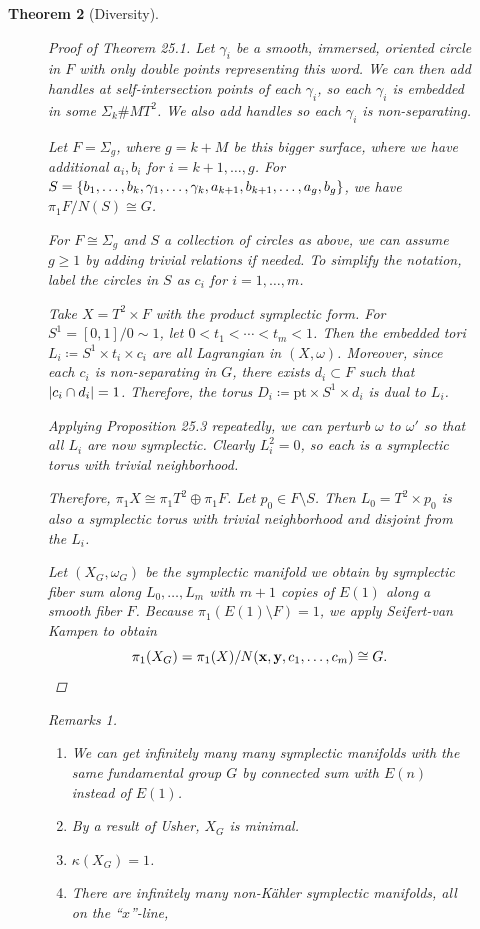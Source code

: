 \documentclass[leqno, openany]{memoir}
\newtheorem{thm}{Theorem}[chapter]
\theoremstyle{definition}
\theoremstyle{remark}
\newtheorem{rmks}[thm]{Remarks}
\theoremstyle{plain}
\theoremstyle{definition}
\theoremstyle{remark}
\newcommand{\mr}[1]{\mathrm{#1}}
\begin{document}
\begin{thm}[Diversity]
\begin{figure}[H]
\begin{proof}[Proof of Theorem 25.1]
        Let $\gamma_i$ be a smooth, immersed, oriented circle in $F$ with only
        double points representing this word. We can then add handles at
        self-intersection points of each $\gamma_i$, so each $\gamma_i$ is
        embedded in some $\Sigma_k \# M T^2$. We also add handles so each
        $\gamma_i$ is \textit{non-separating}.

        Let $F = \Sigma_g$, where $g = k + M$ be this bigger surface, where we
        have additional $a_i,b_i$ for $i = k+1, \ldots, g$. For $S = \qty{b_1,
        \ldots, b_k, \gamma_1, \ldots, \gamma_k, a_{k+1}, b_{k+1}, \ldots, a_g,
    b_g}$, we have $\pi_1 F / N(S) \cong G$. 

        For $F \cong \Sigma_g$ and $S$ a collection of circles as above, we can
        assume $g \geq 1$ by adding trivial relations if needed. To simplify
        the notation, label the circles in $S$ as $c_i$ for $i = 1, \ldots, m$.

        Take $X = T^2 \times F$ with the product symplectic form. For $S^1 =
        [0,1]/0 \sim 1$, let $0 < t_1 < \cdots < t_m < 1$. Then the embedded
        tori $L_i \coloneqq S^1 \times t_i \times c_i$ are all Lagrangian in
        $(X, \omega)$. Moreover, since each $c_i$ is non-separating in $G$,
        there exists $d_i \subset F$ such that $\abs{c_i \cap d_i} = 1$.
        Therefore, the torus $D_i \coloneqq \mr{pt} \times S^1 \times d_i$ is
        dual to $L_i$.

        Applying Proposition 25.3 repeatedly, we can perturb $\omega$ to
        $\omega'$ so that all $L_i$ are now symplectic. Clearly $L_i^2 = 0$, so
        each is a symplectic torus with trivial neighborhood.

        Therefore, $\pi_1 X \cong \pi_1 T^2 \oplus \pi_1 F$. Let $p_0 \in F
        \setminus S$. Then $L_0 = T^2 \times p_0$ is also a symplectic torus
        with trivial neighborhood and disjoint from the $L_i$.

        Let $(X_G, \omega_G)$ be the symplectic manifold we obtain by
        symplectic fiber sum along $L_0, \ldots, L_m$ with $m+1$ copies of
        $E(1)$ along a smooth fiber $F$. Because $\pi_1(E(1) \setminus F) = 1$,
        we apply Seifert-van Kampen to obtain \[ \pi_1(X_G) = \pi_1(X) /
        N(\mathbf{x}, \mathbf{y}, c_1, \ldots, c_m) \cong G. \qedhere \]
    \end{proof}

    \begin{rmks} \begin{enumerate} \item We can get infinitely many many
        symplectic manifolds with the same fundamental group $G$ by connected
        sum with $E(n)$ instead of $E(1)$.  \item By a result of Usher, $X_G$
        is minimal.  \item $\kappa (X_G) = 1$.  \item There are infinitely many
non-K\"ahler symplectic manifolds, all on the ``$x$''-line, \end{enumerate}
\end{rmks}


\end{figure}
\end{thm}
\end{document}
